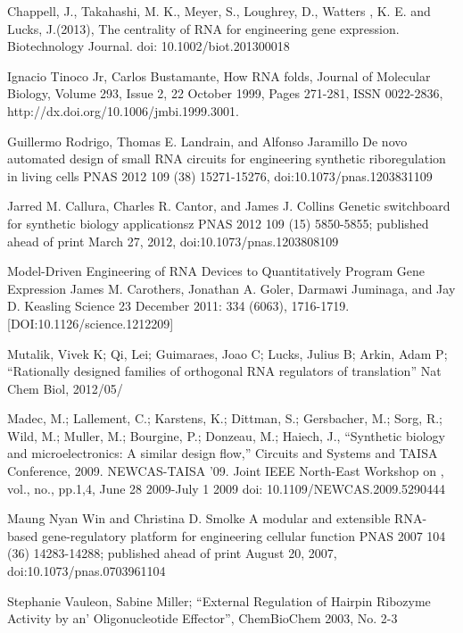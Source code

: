 \documentclass[11pt]{article}
\begin{document}
\begin{thebibliography}{9}

Chappell, J., Takahashi, M. K., Meyer, S., Loughrey, D., Watters
  , K. E. and Lucks, J.(2013), 
  The centrality of RNA for engineering gene expression. 
  Biotechnology Journal. doi: 10.1002/biot.201300018

Ignacio Tinoco Jr, Carlos Bustamante, How RNA folds, 
  Journal of Molecular Biology, Volume 293, Issue 2, 22 October 1999, 
  Pages 271-281, ISSN 0022-2836, http://dx.doi.org/10.1006/jmbi.1999.3001.

Guillermo Rodrigo, Thomas E. Landrain, and Alfonso Jaramillo
  De novo automated design of small RNA circuits for engineering synthetic riboregulation in living cells
  PNAS 2012 109 (38) 15271-15276, doi:10.1073/pnas.1203831109

Jarred M. Callura, Charles R. Cantor, and James J. Collins
  Genetic switchboard for synthetic biology applicationsz
  PNAS 2012 109 (15) 5850-5855; published ahead of print March 27, 2012, doi:10.1073/pnas.1203808109

Model-Driven Engineering of RNA Devices to Quantitatively Program Gene Expression
    James M. Carothers, Jonathan A. Goler, Darmawi Juminaga, and Jay D. Keasling
    Science 23 December 2011: 334 (6063), 1716-1719. [DOI:10.1126/science.1212209]

Mutalik, Vivek K; Qi, Lei; Guimaraes, Joao C; Lucks, Julius B; Arkin, Adam P; ``Rationally designed families of orthogonal RNA regulators of translation'' Nat Chem Biol, 2012/05/

Madec, M.; Lallement, C.; Karstens, K.; Dittman, S.; Gersbacher, M.; Sorg, R.; Wild, M.; Muller, M.; Bourgine, P.; Donzeau, M.; Haiech, J., 
  ``Synthetic biology and microelectronics: A similar design flow,'' Circuits and Systems and TAISA Conference, 2009. NEWCAS-TAISA '09. Joint IEEE North-East Workshop on , vol., no., pp.1,4, June 28 2009-July 1 2009
  doi: 10.1109/NEWCAS.2009.5290444 

Maung Nyan Win and Christina D. Smolke
A modular and extensible RNA-based gene-regulatory platform for engineering cellular function
PNAS 2007 104 (36) 14283-14288; published ahead of print August 20, 2007, doi:10.1073/pnas.0703961104

Stephanie Vauleon, Sabine Miller; ``External Regulation of Hairpin
Ribozyme Activity by an'
Oligonucleotide Effector'', ChemBioChem 2003, No. 2-3


\end{thebibliography}
\end{document}
